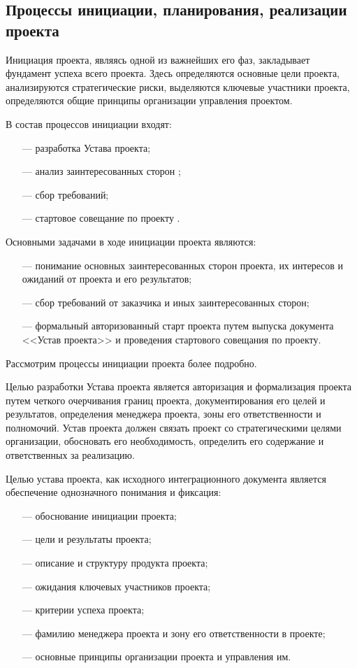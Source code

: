 \subsection{Процессы инициации, планирования, реализации проекта}

Инициация проекта, являясь одной из важнейших его фаз, закладывает фундамент успеха всего проекта.
Здесь определяются основные цели проекта, анализируются стратегические риски, выделяются ключевые участники проекта, определяются общие принципы организации управления проектом.

В состав процессов инициации входят:
\begin{itemize}
	\item [---]разработка Устава проекта;
	\item [---]анализ заинтересованных сторон ;
	\item [---]сбор требований;
	\item [---]стартовое совещание по проекту .
\end{itemize}

Основными задачами в ходе инициации проекта являются:
\begin{itemize}
	\item [---]понимание основных заинтересованных сторон проекта, их интере­сов и ожиданий от проекта и его результатов;
	\item [---]сбор требований от заказчика и иных заинтересованных сторон;
	\item [---]формальный авторизованный старт проекта путем выпуска до­кумента <<Устав проекта>> и проведения стартового совещания по
	проекту.
\end{itemize}

Рассмотрим процессы инициации проекта более подробно.

Целью разработки Устава проекта является авторизация и формализа­ция проекта путем четкого очерчивания границ проекта, документиро­вания его целей и результатов, определения менеджера проекта, зоны его ответственности и полномочий.
Устав проекта должен связать проект со стратегическими целями организации, обосновать его необходимость, определить его содержа­ние и ответственных за реализацию.

Целью устава проекта, как исходного интеграционного документа является обеспечение однозначного понимания и фиксация:
\begin{itemize}
	\item [---] обоснование инициации проекта;
	\item [---] цели и результаты проекта;
	\item [---] описание и структуру продукта проекта;
	\item [---]ожидания ключевых участников проекта;
	\item [---]критерии успеха проекта;
	\item [---]фамилию менеджера проекта и зону его ответственности в проекте;
	\item [---]основные принципы организации проекта и управления им.
\end{itemize}

